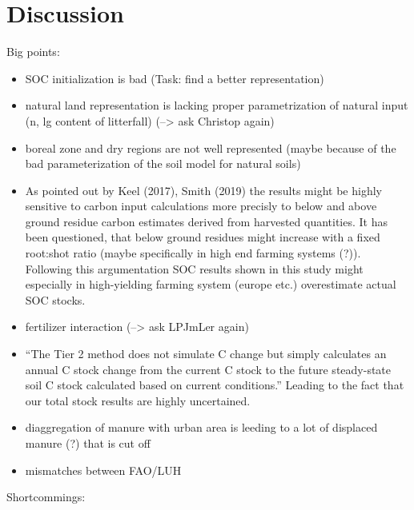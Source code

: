 \documentclass[gc, manuscript]{copernicus}
\begin{document}
\newpage

\hypertarget{discussion}{%
\section{Discussion}\label{discussion}}

Big points:

\begin{itemize}
\item
  SOC initialization is bad (Task: find a better representation)
\item
  natural land representation is lacking proper parametrization of natural input (n, lg content of litterfall) (--\textgreater{} ask Christop again)
\item
  boreal zone and dry regions are not well represented (maybe because of the bad parameterization of the soil model for natural soils)
\item
  As pointed out by Keel (2017), Smith (2019) the results might be highly sensitive to carbon input calculations more precisly to below and above ground residue carbon estimates derived from harvested quantities. It has been questioned, that below ground residues might increase with a fixed root:shot ratio (maybe specifically in high end farming systems (?)). Following this argumentation SOC results shown in this study might especially in high-yielding farming system (europe etc.) overestimate actual SOC stocks.
\item
  fertilizer interaction (--\textgreater{} ask LPJmLer again)
\item
  ``The Tier 2 method does not simulate C change but simply calculates an annual C stock change from the
  current C stock to the future steady-state soil C stock calculated based on current conditions.'' Leading to the fact that our total stock results are highly uncertained.
\item
  diaggregation of manure with urban area is leeding to a lot of displaced manure (?) that is cut off
\item
  mismatches between FAO/LUH
\end{itemize}

Shortcommings:
\end{document}
